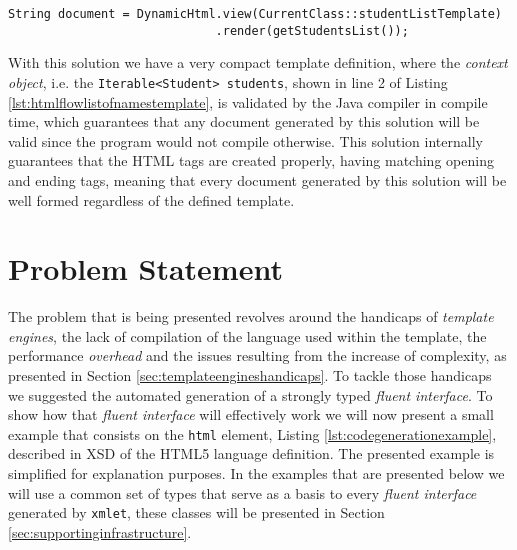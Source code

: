 \bigskip


\begin{minipage}{\linewidth}
\begin{lstlisting}[caption={List of Student Names - Template Building using HtmlFlow with xmlet}, label={lst:htmlflowlistofnamestemplatebuilding}]
String document = DynamicHtml.view(CurrentClass::studentListTemplate)
                             .render(getStudentsList());
\end{lstlisting}
\end{minipage} 

\noindent
With this solution we have a very compact template definition, where the \textit{context object}, i.e. the \texttt{Iterable<Student> students}, shown in line 2 of Listing \ref{lst:htmlflowlistofnamestemplate}, is validated by the Java compiler in compile time, which guarantees that any document generated by this solution will be valid since the program would not compile otherwise. This solution internally guarantees that the \ac{HTML} tags are created properly, having matching opening and ending tags, meaning that every document generated by this solution will be well formed regardless of the defined template.

\section{Problem Statement}
\label{sec:problemstatement}

The problem that is being presented revolves around the handicaps of \textit{template engines}, the lack of compilation of the language used within the template, the performance \textit{overhead} and the issues resulting from the increase of complexity, as presented in Section \ref{sec:templateengineshandicaps}. To tackle those handicaps we suggested the automated generation of a strongly typed \textit{fluent interface}. To show how that \textit{fluent interface} will effectively work we will now present a small example that consists on the \texttt{html} element, Listing \ref{lst:codegenerationexample}, described in \ac{XSD} of the \ac{HTML}5 language definition. The presented example is simplified for explanation purposes. In the examples that are presented below we will use a common set of types that serve as a basis to every \textit{fluent interface} generated by \texttt{xmlet}, these classes will be presented in Section \ref{sec:supportinginfrastructure}. 

